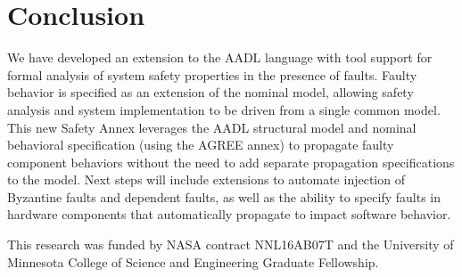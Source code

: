 \section{Conclusion}

We have developed an extension to the AADL language with tool support for formal analysis of system safety properties in the presence of faults. Faulty behavior is specified as an extension of the nominal model, allowing safety analysis and system implementation to be driven from a single common model. This new Safety Annex leverages the AADL structural model and nominal behavioral specification (using the AGREE annex) to propagate faulty component behaviors without the need to add separate propagation specifications to the model.   Next steps will include extensions to automate injection of Byzantine faults and dependent faults, as well as the ability to specify faults in hardware components that automatically propagate to impact software behavior.  

 This research was funded by NASA contract NNL16AB07T and the University of Minnesota College of Science and Engineering Graduate Fellowship.


